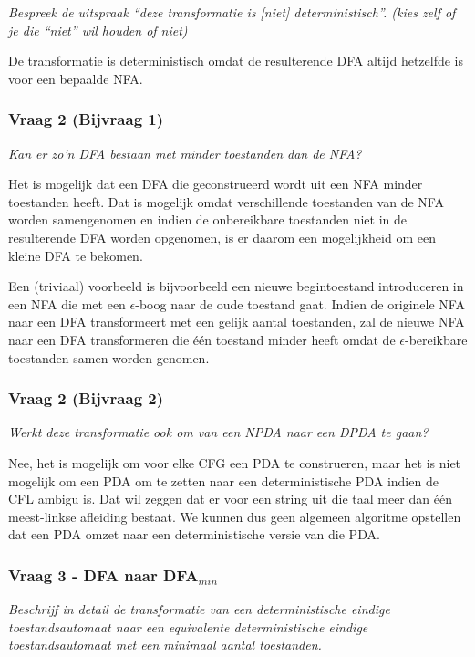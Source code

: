 \textit{Bespreek de uitspraak ``deze transformatie is [niet] deterministisch''. (kies zelf of je die ``niet'' wil houden of niet)}

De transformatie is deterministisch omdat de resulterende DFA altijd hetzelfde is voor een bepaalde NFA.

\subsubsection{Vraag 2 (Bijvraag 1)}

\textit{Kan er zo'n DFA bestaan met minder toestanden dan de NFA?}

Het is mogelijk dat een DFA die geconstrueerd wordt uit een NFA minder toestanden heeft. Dat is mogelijk omdat verschillende toestanden van de NFA worden samengenomen en indien de onbereikbare toestanden niet in de resulterende DFA worden opgenomen, is er daarom een mogelijkheid om een kleine DFA te bekomen.

Een (triviaal) voorbeeld is bijvoorbeeld een nieuwe begintoestand introduceren in een NFA die met een $\epsilon$-boog naar de oude toestand gaat. Indien de originele NFA naar een DFA transformeert met een gelijk aantal toestanden, zal de nieuwe NFA naar een DFA transformeren die \'e\'en toestand minder heeft omdat de $\epsilon$-bereikbare toestanden samen worden genomen.


\subsubsection{Vraag 2 (Bijvraag 2)}

\textit{Werkt deze transformatie ook om van een NPDA naar een DPDA te gaan?}

Nee, het is mogelijk om voor elke CFG een PDA te construeren, maar het is niet mogelijk om een PDA om te zetten naar een deterministische PDA indien de CFL ambigu is. Dat wil zeggen dat er voor een string uit die taal meer dan \'e\'en meest-linkse afleiding bestaat. We kunnen dus geen algemeen algoritme opstellen dat een PDA omzet naar een deterministische versie van die PDA.

\subsubsection{Vraag 3 - DFA naar DFA$_{min}$}

\textit{Beschrijf in detail de transformatie van een deterministische eindige toestandsautomaat naar een equivalente deterministische eindige toestandsautomaat met een minimaal aantal toestanden.}

